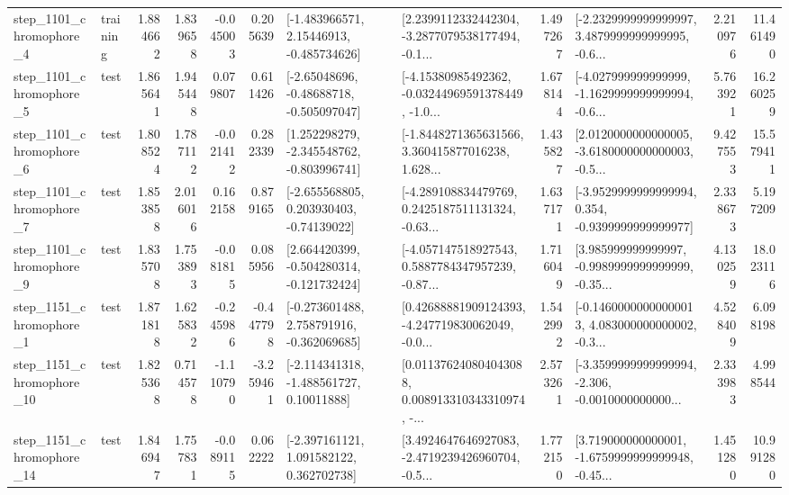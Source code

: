 \begin{tabular}{llrrrrllrlrr}
  step\_1101\_chromophore\_4 &  training &      1.884662 &    1.839658 &     -0.045003 &  0.205639 &    [-1.483966571, 2.15446913, -0.485734626] &  [2.2399112332442304, -3.2877079538177494, -0.1... &       1.497267 &  [-2.2329999999999997, 3.4879999999999995, -0.6... &            2.210976 &         11.461490 \\
  step\_1101\_chromophore\_5 &      test &      1.865641 &    1.945448 &      0.079807 &  0.611426 &    [-2.65048696, -0.48688718, -0.505097047] &  [-4.15380985492362, -0.03244969591378449, -1.0... &       1.678144 &  [-4.027999999999999, -1.1629999999999994, -0.6... &            5.763921 &         16.260259 \\
  step\_1101\_chromophore\_6 &      test &      1.808524 &    1.787112 &     -0.021412 &  0.282339 &   [1.252298279, -2.345548762, -0.803996741] &  [-1.8448271365631566, 3.360415877016238, 1.628... &       1.435827 &  [2.0120000000000005, -3.6180000000000003, -0.5... &            9.427553 &         15.579411 \\
  step\_1101\_chromophore\_7 &      test &      1.853858 &    2.016016 &      0.162158 &  0.879165 &    [-2.655568805, 0.203930403, -0.74139022] &  [-4.289108834479769, 0.2425187511131324, -0.63... &       1.637171 &  [-3.9529999999999994, 0.354, -0.9399999999999977] &            2.338673 &          5.197209 \\
  step\_1101\_chromophore\_9 &      test &      1.835708 &    1.753893 &     -0.081815 &  0.085956 &   [2.664420399, -0.504280314, -0.121732424] &  [-4.057147518927543, 0.5887784347957239, -0.87... &       1.716049 &  [3.985999999999997, -0.9989999999999999, -0.35... &            4.130259 &         18.023116 \\
  step\_1151\_chromophore\_1 &      test &      1.871818 &    1.625832 &     -0.245986 & -0.447798 &   [-0.273601488, 2.758791916, -0.362069685] &  [0.42688881909124393, -4.247719830062049, -0.0... &       1.542992 &  [-0.14600000000000013, 4.083000000000002, -0.3... &            4.528409 &          6.098198 \\
 step\_1151\_chromophore\_10 &      test &      1.825368 &    0.714578 &     -1.110790 & -3.259461 &    [-2.114341318, -1.488561727, 0.10011888] &  [0.011376240804043088, 0.008913310343310974, -... &       2.573261 &  [-3.3599999999999994, -2.306, -0.0010000000000... &            2.333983 &          4.998544 \\
 step\_1151\_chromophore\_14 &      test &      1.846947 &    1.757831 &     -0.089115 &  0.062222 &    [-2.397161121, 1.091582122, 0.362702738] &  [3.4924647646927083, -2.4719239426960704, -0.5... &       1.772150 &  [3.719000000000001, -1.6759999999999948, -0.45... &            1.451280 &         10.991280 \\

\end{tabular}
